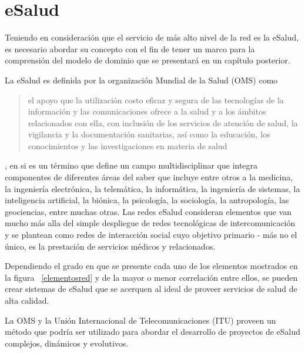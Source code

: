 \section{eSalud}
Teniendo en consideración que el servicio de más alto nivel de la red es la eSalud, es necesario abordar su concepto con el fin de tener un marco para la comprensión del modelo de dominio que se presentará en un capítulo posterior.

La eSalud es definida por la organización Mundial de la Salud (OMS) \cite{oms2016} como \begin{quote}el apoyo que la utilización costo eficaz y segura de las tecnologías de la información y las comunicaciones ofrece a la salud y a los ámbitos relacionados con ella, con inclusión de los servicios de atención de salud, la vigilancia y la documentación sanitarias, así como la educación, los conocimientos y las investigaciones en materia de salud\end{quote}, en si es un término que define un campo multidisciplinar que integra componentes de diferentes áreas del saber que incluye entre otros a la medicina, la ingeniería electrónica, la telemática, la informática, la ingeniería de sistemas, la inteligencia artificial, la biónica, la psicología, la sociología, la antropología, las geociencias, entre muchas otras. Las redes eSalud consideran elementos que van mucho más alla del simple despliegue de redes tecnológicas de intercomunicación y se plantean como redes de interacción social cuyo objetivo primario - más no el único, es la prestación de servicios médicos y relacionados.

Dependiendo el grado en que se presente cada uno de los elementos mostrados en la figura ~\ref{elementosred} y de la mayor o menor correlación entre ellos, se pueden crear sistemas de eSalud que se acerquen al ideal de proveer servicios de salud de alta calidad. 

La OMS y la Unión Internacional de Telecomunicaciones (ITU) proveen \cite{ituoms2012} un método que podría ser utilizado para abordar el desarrollo de proyectos de eSalud complejos, dinámicos y evolutivos. 

